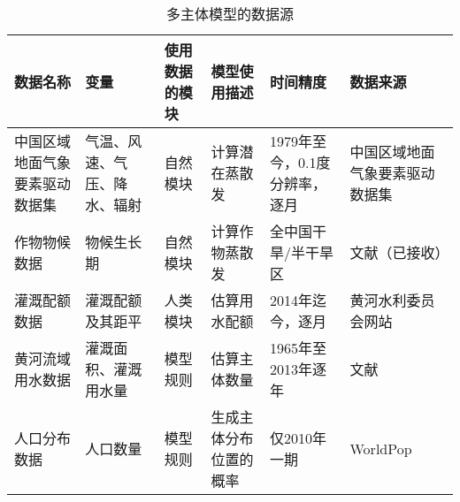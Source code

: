 \begin{table}[htbp]
    \centering
    \caption{多主体模型的数据源}
      \begin{tabularx}{\textwidth}{LLLLLL}
      \toprule
      数据名称  & 变量    & 使用数据的模块 & 模型使用描述 & 时间精度  & 数据来源 \\
      \midrule
      中国区域地面气象要素驱动数据集 & 气温、风速、气压、降水、辐射 & 自然模块  & 计算潜在蒸散发 & 1979年至今，0.1度分辨率，逐月 & 中国区域地面气象要素驱动数据集~\cite{chen2015} \\
      作物物候数据 & 物候生长期 & 自然模块  & 计算作物蒸散发 & 全中国干旱/半干旱区 & 文献（已接收） \\
      灌溉配额数据 & 灌溉配额及其距平 & 人类模块  & 估算用水配额 & 2014年迄今，逐月 & 黄河水利委员会网站 \\
      黄河流域用水数据 & 灌溉面积、灌溉用水量 & 模型规则  & 估算主体数量 & 1965年至2013年逐年 & 文献\cite{zhou2020} \\
      人口分布数据 & 人口数量  & 模型规则  & 生成主体分布位置的概率 & 仅2010年一期 & WorldPop\cite{worldpop2020} \\
      \bottomrule
      \end{tabularx}%
    \label{ch6:tab:dataset}%
  \end{table}%
  